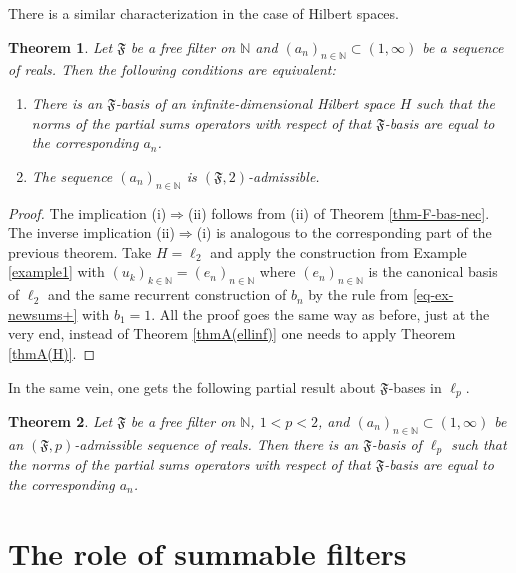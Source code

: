 \documentclass[11pt,twoside, reqno]{amsart}
\newcommand{\N}{{\mathbb N}}
\newcommand{\F}{\mathfrak{F}}
\theoremstyle{plain}
\newtheorem{theorem}{Theorem}[section]
\theoremstyle{remark}
\theoremstyle{definition}
\numberwithin{equation}{section}
\begin{document}
There is a similar characterization in the case of Hilbert spaces.

\begin{theorem}  \label{thm-F-bas-2}
Let $\F$ be a free filter on $\N$ and $ (a_n)_{n \in \N} \subset (1, \infty)$ be a sequence of reals. Then the following conditions are equivalent:
\begin{enumerate}
\item[(i)] There is an $\F$-basis of an infinite-dimensional Hilbert space $H$ such that the norms of the partial sums operators with respect of that $\F$-basis are equal to the corresponding $a_n$.

\item[(ii)] The sequence $ (a_n)_{n \in \N}$ is $(\F, 2)$-admissible.
\end{enumerate}
\end{theorem}
\begin{proof}
The implication (i)$\Longrightarrow$(ii) follows from (ii) of Theorem \ref{thm-F-bas-nec}. The inverse implication (ii)$\Longrightarrow$(i) is analogous to the corresponding part of the previous theorem. Take $H=\ell_2$ and  apply the construction from Example \ref{example1} with $(u_k)_{k \in \N} = (e_n)_{n \in \N}$ where $ (e_n)_{n \in \N}$ is the canonical basis of $\ell_2$ and the same recurrent construction of  $b_n$ by the rule from \eqref{eq-ex-newsums+} with  $b_1=1$.
All the proof goes the same way as before, just at the very end, instead of Theorem \ref{thmA(ellinf)} one needs to apply Theorem \ref{thmA(H)}.
\end{proof}

In the same vein, one gets the following partial result about $\F$-bases in $\ell_p$.

\begin{theorem}  \label{thm-F-bas-3}
Let $\F$ be a free filter on $\N$, $1 < p < 2$, and $ (a_n)_{n \in \N} \subset (1, \infty)$ be an $(\F, p)$-admissible sequence of reals. Then there is an $\F$-basis of $\ell_p$ such that the norms of the partial sums operators with respect of that $\F$-basis are equal to the corresponding $a_n$.
\end{theorem}



\section{The role of summable filters} \label{sec_5}
\end{document}

